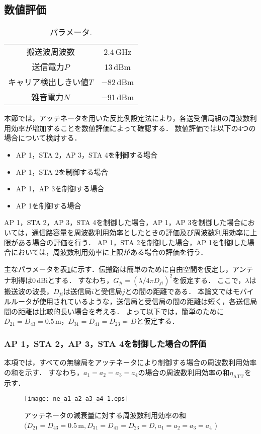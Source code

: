\documentclass[master]{kuisthesis}		%
\begin{document}
\subsection{数値評価} \label{数値評価}
\begin{table}[t]
\caption{パラメータ.}
\label{para}
\begin{center}
\begin{tabular}{cc}
\hline
搬送波周波数 & 2.4\,GHz \\
送信電力$P$ & 13\,dBm \\
キャリア検出しきい値$T$ & $-$82\,dBm \\
雑音電力$N$ & $-$91\,dBm \\
\hline 
\end{tabular}
\end{center}
\end{table}
本節では，アッテネータを用いた反比例設定法により，各送受信局組の周波数利用効率が増加することを数値評価によって確認する．
数値評価では以下の4つの場合について検討する．
\begin{itemize}
\item AP 1，STA 2，AP 3，STA 4を制御する場合
\item AP 1，STA 2を制御する場合
\item AP 1，AP 3を制御する場合
\item AP 1を制御する場合
\end{itemize}
AP 1，STA 2，AP 3，STA 4を制御した場合，AP 1，AP 3を制御した場合においては，通信路容量を周波数利用効率としたときの評価及び周波数利用効率に上限がある場合の評価を行う．
AP 1，STA 2を制御した場合，AP 1を制御した場合においては，周波数利用効率に上限がある場合の評価を行う．

主なパラメータを表\ref{para}に示す．伝搬路は簡単のために自由空間を仮定し，アンテナ利得は0\,dBiとする．
すなわち，$G_{ji}=({\lambda}/{4\pi D_{ji}})^2$を仮定する．
ここで，$\lambda$は搬送波の波長，$D_{ji}$は送信局$i$と受信局$j$との間の距離である．
本論文ではモバイルルータが使用されているような，送信局と受信局の間の距離は短く，各送信局間の距離は比較的長い場合を考える．
よって以下では，簡単のために$D_{21}=D_{43}=0.5\,\mathrm{m}$，$D_{31}=D_{41}=D_{23}\eqqcolon D$と仮定する．

\subsubsection{AP 1，STA 2，AP 3，STA 4を制御した場合の評価}\label{全端末制御数値評価}
本項では，すべての無線局をアッテネータにより制御する場合の周波数利用効率の和を示す．
すなわち，$a_1=a_2=a_3=a_4$の場合の周波数利用効率の和$\eta_\mathrm{ATT}$を示す．
\ifnum {}
\begin{figure}[!t]
\centering
\texttt{[image: ne\_a1\_a2\_a3\_a4\_1.eps]}
\caption{アッテネータの減衰量に対する周波数利用効率の和   \newline $(D_{21}=D_{43}=0.5\,\mathrm{m},D_{31}=D_{41}=D_{23}=D,a_1=a_2=a_3=a_4$ )}
\label{fig1}
\end{figure}
\fi
\end{document}
